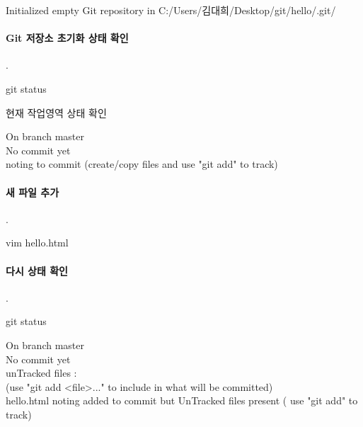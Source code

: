 \documentclass[12pt, a4paper, oneside]{book}
\begin{document}
		\begin{tcolorbox}
			Initialized empty Git repository in C:/Users/김대희/Desktop/git/hello/.git/
		\end{tcolorbox}



\paragraph{Git 저장소 초기화 상태 확인}
		.\\

			\begin{tcolorbox}		[
									title=깃 저장소 초기화 상태 확인
									]
									git status
			\end{tcolorbox}
			현재 작업영역 상태 확인

		\begin{tcolorbox}
			On branch master \\
			No commit yet \\
			noting to commit (create/copy files and use "git add" to track)
		\end{tcolorbox}


\paragraph{새 파일 추가}
		.\\

			\begin{tcolorbox}		[
									title=새 파일 추가
									]
									vim hello.html
			\end{tcolorbox}


\paragraph{다시 상태 확인}
		.\\

			\begin{tcolorbox}		[
									title=다시 상태 확인
									]
									git status
			\end{tcolorbox}

		\begin{tcolorbox}
			On branch master \\
			No commit yet \\
			unTracked files :\\
			(use "git add <file>..." to include in what will be committed)\\
				hello.html
			noting added to commit but UnTracked files present ( use "git add" to track)
		\end{tcolorbox}
\end{document}
